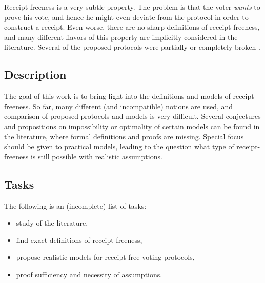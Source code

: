 \documentclass{article}
\begin{document}
\begin{appendix}
Receipt-freeness is a very subtle property. The problem is that the voter
{\em wants\/} to prove his vote, and hence he might even deviate from the
protocol in order to construct a receipt. Even worse, there are no sharp
definitions of receipt-freeness, and many different flavors of this
property are implicitly considered in the literature. Several of the
proposed protocols were partially or completely broken
\cite{MicHor96,Okamot97,Schoen99:pc,HirSak00}.


\subsection{Description}

The goal of this work is to bring light into the definitions and models of
receipt-freeness. So far, many different (and incompatible) notions are
used, and comparison of proposed protocols and models is very difficult.
Several conjectures and propositions on impossibility or optimality of
certain models can be found in the literature, where formal definitions and
proofs are missing. Special focus should be given to practical models,
leading to the question what type of receipt-freeness is still possible
with realistic assumptions.


\subsection{Tasks}

The following is an (incomplete) list of tasks:
\begin{itemize}
  \item study of the literature,
  \item find exact definitions of receipt-freeness,
  \item propose realistic models for receipt-free voting protocols,
  \item proof sufficiency and necessity of assumptions.
\end{itemize}


\end{appendix}




\end{document}
